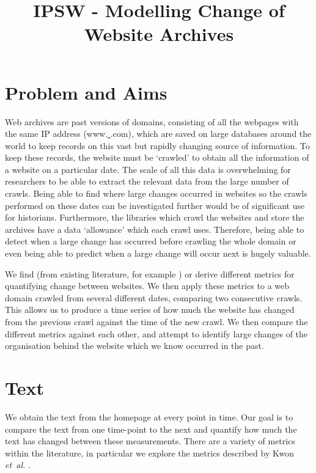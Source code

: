 \documentclass[10pt, a4paper]{article}
\begin{document}
\title{IPSW - Modelling Change of Website Archives}
\author{\vspace{-5ex}}
\date{\vspace{-5ex}}
\maketitle

\vspace{-12mm}

\section{Problem and Aims}

\vspace{-2mm}

 Web archives are past versions of domains, consisting of all the webpages with the same IP address (www.\underline{ }\underline{ }\underline{ }\underline{ }\underline{ }\underline{ }.com), which are saved on large databases around the world to keep records on this vast but rapidly changing source of information.
 To keep these records, the website must be `crawled' to obtain all the information of a website on a particular date.
 The scale of all this data is overwhelming for researchers to be able to extract the relevant data from the large number of crawls.
 Being able to find where large changes occurred in websites so the crawls performed on these dates can be investigated further would be of significant use for historians.
 Furthermore, the libraries which crawl the websites and store the archives have a data `allowance' which each crawl uses.
 Therefore, being able to detect when a large change has occurred before crawling the whole domain or even being able to predict when a large change will occur next is hugely valuable.
 
 We find (from existing literature, for example \cite{dhyani2002survey}) or derive different metrics for quantifying change between websites.
 We then apply these metrics to a web domain crawled from several different dates, comparing two consecutive crawls.
 This allows us to produce a time series of how much the website has changed from the previous crawl against the time of the new crawl.
 We then compare the different metrics against each other, and attempt to identify large changes of the organisation behind the website which we know occurred in the past.
\vspace{-3mm}

\section{Text}
\label{sec:text}
\vspace{-2mm}
We obtain the text from the homepage at every point in time. Our goal is to compare the text from one time-point to the next and quantify how much the text has changed between these measurements. There are a variety of metrics within the literature, in particular we explore the metrics described by Kwon \textit{et~al.} \cite{kwon2006precise}.
\vspace{-2mm}
\end{document}
